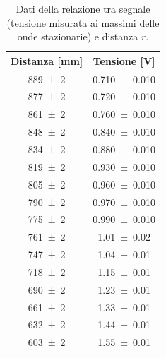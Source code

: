 \documentclass[a4paper]{article}
\begin{document}
\begin{table}[htbp]
\centering
\caption{Dati della relazione tra segnale (tensione misurata ai massimi delle onde stazionarie) e distanza $r$.}
\label{tab:dati_ampgeom_massimi_distanza}
\begin{tabular}{|c|c|}
\hline
Distanza [\si{\milli\metre}] & Tensione [\si{\volt}] \\\hline\hline
\SI{889 \pm 2}{} & \SI{0.710 \pm 0.010}{} \\
\SI{877 \pm 2}{} & \SI{0.720 \pm 0.010}{} \\
\SI{861 \pm 2}{} & \SI{0.760 \pm 0.010}{} \\
\SI{848 \pm 2}{} & \SI{0.840 \pm 0.010}{} \\
\SI{834 \pm 2}{} & \SI{0.880 \pm 0.010}{} \\
\SI{819 \pm 2}{} & \SI{0.930 \pm 0.010}{} \\
\SI{805 \pm 2}{} & \SI{0.960 \pm 0.010}{} \\
\SI{790 \pm 2}{} & \SI{0.970 \pm 0.010}{} \\
\SI{775 \pm 2}{} & \SI{0.990 \pm 0.010}{} \\
\SI{761 \pm 2}{} & \SI{1.01 \pm 0.02}{} \\
\SI{747 \pm 2}{} & \SI{1.04 \pm 0.01}{} \\
\SI{718 \pm 2}{} & \SI{1.15 \pm 0.01}{} \\
\SI{690 \pm 2}{} & \SI{1.23 \pm 0.01}{} \\
\SI{661 \pm 2}{} & \SI{1.33 \pm 0.01}{} \\
\SI{632 \pm 2}{} & \SI{1.44 \pm 0.01}{} \\
\SI{603 \pm 2}{} & \SI{1.55 \pm 0.01}{} \\
\hline
\end{tabular}
\end{table}
\end{document}
